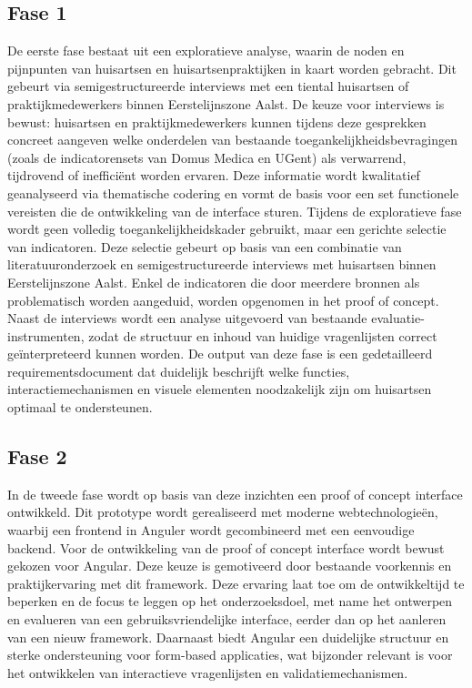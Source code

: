 \subsection{Fase 1}
\label{ter:Fase 1}
De eerste fase bestaat uit een exploratieve analyse, waarin de noden en pijnpunten van huisartsen en huisartsenpraktijken in kaart worden gebracht.
Dit gebeurt via semigestructureerde interviews met een tiental huisartsen of praktijkmedewerkers binnen Eerstelijnszone Aalst.
De keuze voor interviews is bewust: huisartsen en praktijkmedewerkers kunnen tijdens deze gesprekken concreet aangeven welke onderdelen van bestaande toegankelijkheidsbevragingen (zoals de indicatorensets van Domus Medica en UGent) \autocite{Merckx2023} als verwarrend, tijdrovend of inefficiënt worden ervaren.
Deze informatie wordt kwalitatief geanalyseerd via thematische codering en vormt de basis voor een set functionele vereisten die de ontwikkeling van de interface sturen.
Tijdens de exploratieve fase wordt geen volledig toegankelijkheidskader gebruikt, maar een gerichte selectie van indicatoren.
Deze selectie gebeurt op basis van een combinatie van literatuuronderzoek en semigestructureerde interviews met huisartsen binnen Eerstelijnszone Aalst.
Enkel de indicatoren die door meerdere bronnen als problematisch worden aangeduid, worden opgenomen in het proof of concept.
Naast de interviews wordt een analyse uitgevoerd van bestaande evaluatie-instrumenten, zodat de structuur en inhoud van huidige vragenlijsten correct geïnterpreteerd kunnen worden.
De output van deze fase is een gedetailleerd requirementsdocument dat duidelijk beschrijft welke functies, interactiemechanismen en visuele elementen noodzakelijk zijn om huisartsen optimaal te ondersteunen.
\subsection{Fase 2}
\label{ter:Fase 2}
In de tweede fase wordt op basis van deze inzichten een proof of concept interface ontwikkeld.
Dit prototype wordt gerealiseerd met moderne webtechnologieën, waarbij een frontend in Anguler wordt gecombineerd met een eenvoudige backend.
Voor de ontwikkeling van de proof of concept interface wordt bewust gekozen voor Angular.
Deze keuze is gemotiveerd door bestaande voorkennis en praktijkervaring met dit framework.
Deze ervaring laat toe om de ontwikkeltijd te beperken en de focus te leggen op het onderzoeksdoel, met name het ontwerpen en evalueren van een gebruiksvriendelijke interface, eerder dan op het aanleren van een nieuw framework.
Daarnaast biedt Angular een duidelijke structuur en sterke ondersteuning voor form-based applicaties,
wat bijzonder relevant is voor het ontwikkelen van interactieve vragenlijsten en validatiemechanismen.\\\\

